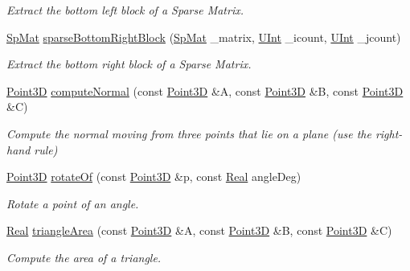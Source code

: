 \begin{DoxyCompactItemize}
\begin{DoxyCompactList}\small\item\em Extract the bottom left block of a Sparse Matrix. \end{DoxyCompactList}\item 
\hyperlink{namespaceFVCode3D_ac1032289d96638cf0ad6c52ef639095f}{Sp\+Mat} \hyperlink{namespaceFVCode3D_a2468aefbc3231765755c7316f146bc3d}{sparse\+Bottom\+Right\+Block} (\hyperlink{namespaceFVCode3D_ac1032289d96638cf0ad6c52ef639095f}{Sp\+Mat} \+\_\+matrix, \hyperlink{namespaceFVCode3D_a4bf7e328c75d0fd504050d040ebe9eda}{U\+Int} \+\_\+icount, \hyperlink{namespaceFVCode3D_a4bf7e328c75d0fd504050d040ebe9eda}{U\+Int} \+\_\+jcount)
\begin{DoxyCompactList}\small\item\em Extract the bottom right block of a Sparse Matrix. \end{DoxyCompactList}\item 
\hyperlink{classFVCode3D_1_1Point3D}{Point3D} \hyperlink{namespaceFVCode3D_afdf87b62988c2271186926eb3a3baedc}{compute\+Normal} (const \hyperlink{classFVCode3D_1_1Point3D}{Point3D} \&A, const \hyperlink{classFVCode3D_1_1Point3D}{Point3D} \&B, const \hyperlink{classFVCode3D_1_1Point3D}{Point3D} \&C)
\begin{DoxyCompactList}\small\item\em Compute the normal moving from three points that lie on a plane (use the right-\/hand rule) \end{DoxyCompactList}\item 
\hyperlink{classFVCode3D_1_1Point3D}{Point3D} \hyperlink{namespaceFVCode3D_aefa056e4f7c5d10edd993b812dd670da}{rotate\+Of} (const \hyperlink{classFVCode3D_1_1Point3D}{Point3D} \&p, const \hyperlink{namespaceFVCode3D_a40c1f5588a248569d80aa5f867080e83}{Real} angle\+Deg)
\begin{DoxyCompactList}\small\item\em Rotate a point of an angle. \end{DoxyCompactList}\item 
\hyperlink{namespaceFVCode3D_a40c1f5588a248569d80aa5f867080e83}{Real} \hyperlink{namespaceFVCode3D_a38b320ef9683fae74a67a2a5a921f0d9}{triangle\+Area} (const \hyperlink{classFVCode3D_1_1Point3D}{Point3D} \&A, const \hyperlink{classFVCode3D_1_1Point3D}{Point3D} \&B, const \hyperlink{classFVCode3D_1_1Point3D}{Point3D} \&C)
\begin{DoxyCompactList}\small\item\em Compute the area of a triangle. \end{DoxyCompactList}\item 

\end{DoxyCompactItemize}
